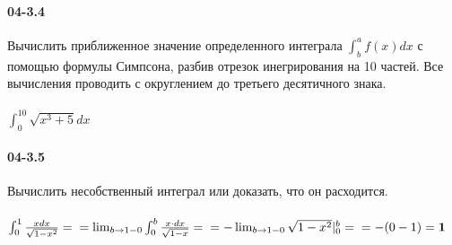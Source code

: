 \documentclass[12pt]{article}
\begin{document}
	\paragraph{04-3.4} Вычислить приближенное значение определенного интеграла \ensuremath{\int_{b}^{a} f(x) dx} с помощью формулы Симпсона, разбив отрезок инегрирования на 10 частей. Все вычисления проводить с округлением до третьего десятичного знака.
	\\\\
	\ensuremath{\int_{0}^{10}\sqrt{x ^3 + 5} dx}
	\\

	\paragraph{04-3.5} Вычислить несобственный интеграл или доказать, что он расходится.
	\\\\
	\ensuremath{
		\int_{0}^{1} \frac{x dx}{\sqrt{1 - x ^2} } = \\
		= \lim_{b \to 1-0} \int_{0}^{b} \frac{x \cdot dx}{\sqrt{1 - x}} = \\
		= - \lim_{b \to 1-0} \sqrt{1 - x^2}|_{0}^{b} = \\
		= - ( 0 - 1 ) = {\bf 1 }
	}
\end{document}
